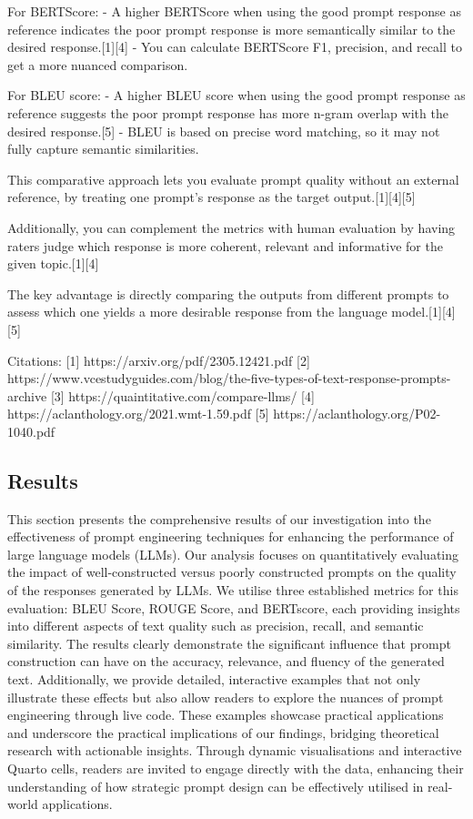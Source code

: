 \documentclass[
]{agujournal2019}
\begin{document}
For BERTScore: - A higher BERTScore when using the good prompt response
as reference indicates the poor prompt response is more semantically
similar to the desired response.{[}1{]}{[}4{]} - You can calculate
BERTScore F1, precision, and recall to get a more nuanced comparison.

For BLEU score: - A higher BLEU score when using the good prompt
response as reference suggests the poor prompt response has more n-gram
overlap with the desired response.{[}5{]} - BLEU is based on precise
word matching, so it may not fully capture semantic similarities.

This comparative approach lets you evaluate prompt quality without an
external reference, by treating one prompt's response as the target
output.{[}1{]}{[}4{]}{[}5{]}

Additionally, you can complement the metrics with human evaluation by
having raters judge which response is more coherent, relevant and
informative for the given topic.{[}1{]}{[}4{]}

The key advantage is directly comparing the outputs from different
prompts to assess which one yields a more desirable response from the
language model.{[}1{]}{[}4{]}{[}5{]}

Citations: {[}1{]} https://arxiv.org/pdf/2305.12421.pdf {[}2{]}
https://www.vcestudyguides.com/blog/the-five-types-of-text-response-prompts-archive
{[}3{]} https://quaintitative.com/compare-llms/ {[}4{]}
https://aclanthology.org/2021.wmt-1.59.pdf {[}5{]}
https://aclanthology.org/P02-1040.pdf

\subsection{Results}\label{results}

This section presents the comprehensive results of our investigation
into the effectiveness of prompt engineering techniques for enhancing
the performance of large language models (LLMs). Our analysis focuses on
quantitatively evaluating the impact of well-constructed versus poorly
constructed prompts on the quality of the responses generated by LLMs.
We utilise three established metrics for this evaluation: BLEU Score,
ROUGE Score, and BERTscore, each providing insights into different
aspects of text quality such as precision, recall, and semantic
similarity. The results clearly demonstrate the significant influence
that prompt construction can have on the accuracy, relevance, and
fluency of the generated text. Additionally, we provide detailed,
interactive examples that not only illustrate these effects but also
allow readers to explore the nuances of prompt engineering through live
code. These examples showcase practical applications and underscore the
practical implications of our findings, bridging theoretical research
with actionable insights. Through dynamic visualisations and interactive
Quarto cells, readers are invited to engage directly with the data,
enhancing their understanding of how strategic prompt design can be
effectively utilised in real-world applications.
\end{document}
